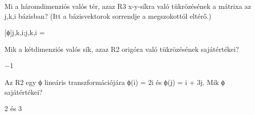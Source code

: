 \begin{frame}
  \begin{tcolorbox}[title={9/2. -R-}]
    Mi a háromdimenziós valós tér, azaz R3 x-y-síkra való tükrözésének a mátrixa az j,k,i bázisban? (Itt a bázisvektorok sorrendje a megszokottól eltérő.)

  \tcblower

    \mmedskip 
    
     [ϕ]j,k,i;j,k,i =
  \end{tcolorbox}
\end{frame}


\begin{frame}
  \begin{tcolorbox}[title={9/3. -N-}]
    Mik a kétdimenziós valós sík, azaz R2 origóra való tükrözésének sajátértékei?

  \tcblower

    \mmedskip 
    
    −1
  \end{tcolorbox}
\end{frame}


\begin{frame}
  \begin{tcolorbox}[title={9/4. -R-}]
    Az R2 egy ϕ lineáris transzformációjára ϕ(i) = 2i és ϕ(j) = i + 3j. Mik ϕ sajátértékei? 
    
  \tcblower

    \mmedskip 
    
     2 és 3
  \end{tcolorbox}
\end{frame}


